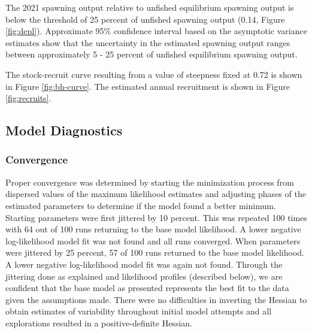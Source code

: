 \documentclass[11pt,
  english,
  a4paper,
]{article}
\begin{document}

The 2021 spawning output relative to unfished equilibrium spawning output is below the threshold of 25 percent of unfished spawning output (0.14, Figure \ref{fig:depl}). Approximate 95\% confidence interval based on the asymptotic variance estimates show that the uncertainty in the estimated spawning output ranges between approximately 5 - 25 percent of unfished equilibrium spawning output.

\leavevmode\tagmcend\tagstructend\par


The stock-recruit curve resulting from a value of steepness fixed at 0.72 is shown in Figure \ref{fig:bh-curve}. The estimated annual recruitment is shown in Figure \ref{fig:recruits}.

\leavevmode\tagmcend\tagstructend\par


\hypertarget{model-diagnostics}{%
\subsection{Model Diagnostics}\label{model-diagnostics}}

\leavevmode\tagmcend\tagstructend


\hypertarget{convergence}{%
\subsubsection{Convergence}\label{convergence}}

\leavevmode\tagmcend\tagstructend


Proper convergence was determined by starting the minimization process from dispersed values of the maximum likelihood estimates and adjusting phases of the estimated parameters to determine if the model found a better minimum. Starting parameters were first jittered by 10 percent. This was repeated 100 times with 64 out of 100 runs returning to the base model likelihood. A lower negative log-likelihood model fit was not found and all runs converged. When parameters were jittered by 25 percent, 57 of 100 runs returned to the base model likelihood. A lower negative log-likelihood model fit was again not found. Through the jittering done as explained and likelihood profiles (described below), we are confident that the base model as presented represents the best fit to the data given the assumptions made. There were no difficulties in inverting the Hessian to obtain estimates of variability throughout initial model attempts and all explorations resulted in a positive-definite Hessian.
\end{document}
